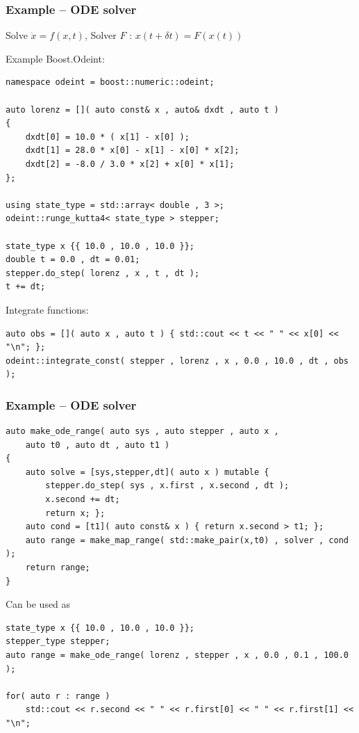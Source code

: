 \documentclass{beamer}
\newcommand{\heading}[1]{\frametitle{#1}}
\newcommand{\odeint}[0]{Boost.Odeint}
\begin{document}
\begin{frame}[fragile]
  \heading{Example -- ODE solver}
  
  Solve $\dot{x} = f(x,t)$, Solver $F$ : $x(t+\delta t)=F(x(t))$
  
  Example \odeint:
  
\begin{lstlisting}[basicstyle=\tiny\ttfamily]
namespace odeint = boost::numeric::odeint;

auto lorenz = []( auto const& x , auto& dxdt , auto t )
{
    dxdt[0] = 10.0 * ( x[1] - x[0] );
    dxdt[1] = 28.0 * x[0] - x[1] - x[0] * x[2];
    dxdt[2] = -8.0 / 3.0 * x[2] + x[0] * x[1];
};

using state_type = std::array< double , 3 >;
odeint::runge_kutta4< state_type > stepper;

state_type x {{ 10.0 , 10.0 , 10.0 }};
double t = 0.0 , dt = 0.01;
stepper.do_step( lorenz , x , t , dt );
t += dt;
  \end{lstlisting}
  
Integrate functions:
\begin{lstlisting}[basicstyle=\tiny\ttfamily]
auto obs = []( auto x , auto t ) { std::cout << t << " " << x[0] << "\n"; };
odeint::integrate_const( stepper , lorenz , x , 0.0 , 10.0 , dt , obs );
\end{lstlisting}

\end{frame}

\begin{frame}[fragile]
 \heading{Example -- ODE solver}
 
 \begin{lstlisting}[basicstyle=\tiny\ttfamily]
auto make_ode_range( auto sys , auto stepper , auto x ,
    auto t0 , auto dt , auto t1 )
{
    auto solve = [sys,stepper,dt]( auto x ) mutable { 
        stepper.do_step( sys , x.first , x.second , dt );
        x.second += dt;
        return x; };
    auto cond = [t1]( auto const& x ) { return x.second > t1; };
    auto range = make_map_range( std::make_pair(x,t0) , solver , cond );
    return range;
}
 \end{lstlisting}
 
 Can be used as
\begin{lstlisting}[basicstyle=\tiny\ttfamily]
state_type x {{ 10.0 , 10.0 , 10.0 }};
stepper_type stepper;
auto range = make_ode_range( lorenz , stepper , x , 0.0 , 0.1 , 100.0 );

for( auto r : range )
    std::cout << r.second << " " << r.first[0] << " " << r.first[1] << "\n"; 
\end{lstlisting}

\end{frame}
\end{document}
